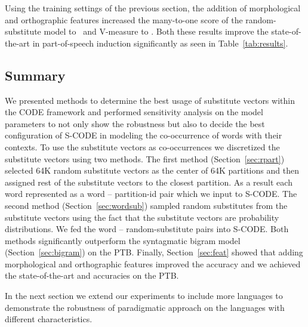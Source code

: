 Using the training settings of the previous section, the addition of
morphological and orthographic features increased the many-to-one
score of the random-substitute model to \ftmto\ and V-measure to
\ftvm.  Both these results improve the state-of-the-art in
part-of-speech induction significantly as seen in
Table~\ref{tab:results}.

\subsection{Summary}
\label{sec:expsum}

We presented methods to determine the best usage of substitute vectors
within the CODE framework and performed sensitivity analysis on the
model parameters to not only show the robustness but also to decide
the best configuration of S-CODE in modeling the co-occurrence of
words with their contexts.  To use the substitute vectors as
co-occurrences we discretized the substitute vectors using two
methods.  The first method (Section~\ref{sec:rpart}) selected 64K
random substitute vectors as the center of 64K partitions and then
assigned rest of the substitute vectors to the closest partition.  As
a result each word represented as a word -- partition-id pair which we
input to S-CODE. The second method (Section~\ref{sec:wordsub}) sampled
random substitutes from the substitute vectors using the fact that the
substitute vectors are probability distributions.  We fed the word --
random-substitute pairs into S-CODE.  Both methods significantly
outperform the syntagmatic bigram model (Section~\ref{sec:bigram}) on
the PTB.  Finally, Section~\ref{sec:feat} showed that adding
morphological and orthographic features improved the accuracy and we
achieved the state-of-the-art \mto and \vm accuracies on the PTB.

In the next section we extend our experiments to include more
languages to demonstrate the robustness of paradigmatic approach on
the languages with different characteristics.
